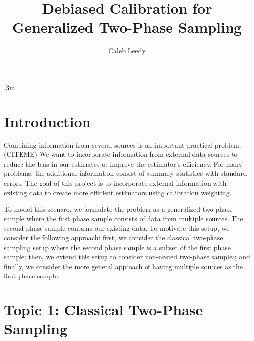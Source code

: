 \documentclass[12pt]{article}
\begin{document}
\title{Debiased Calibration for Generalized Two-Phase Sampling}
\author{Caleb Leedy}
\maketitle 

\baselineskip .3in

\section{Introduction}

Combining information from several sources is an important practical problem. (CITEME)
We want to incorporate information from external data sources to reduce the bias
in our estimates or improve the estimator's efficiency. For many problems, the
additional information consist of summary statistics with standard errors. The
goal of this project is to incorporate external information with existing data 
to create more efficient estimators using calibration weighting.

To model this scenaro, we formulate the problem as a generalized two-phase
sample where the first phase sample consists of data from multiple sources. The
second phase sample contains our existing data. To motivate this setup, we
consider the following approach: first, we consider the classical two-phase
sampling setup where the second phase sample is a subset of the first phase
sample; then, we extend this setup to consider non-nested two-phase samples;
and finally, we consider the more general approach of having multiple sources as
the first phase sample.


\section{Topic 1: Classical Two-Phase Sampling}
\end{document}
